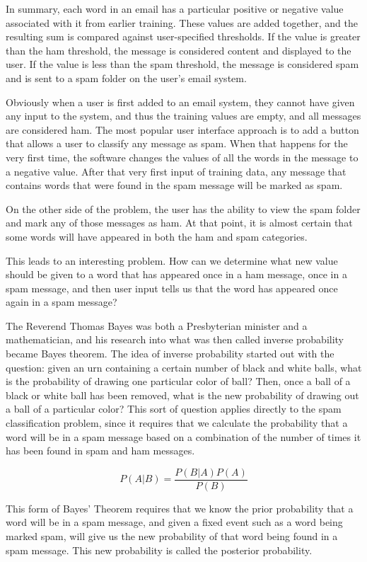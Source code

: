 \documentclass[12pt]{article}
\begin{document}
In summary, each word in an email has a particular positive or negative value associated with it from earlier
training. These values are added together, and the resulting sum is compared against user-specified
thresholds. If the value is greater than the ham threshold, the message is considered content and displayed to
the user. If the value is less than the spam threshold, the message is considered spam and is sent to a spam
folder on the user's email system.

Obviously when a user is first added to an email system, they cannot have given any input to the system, and
thus the training values are empty, and all messages are considered ham. The most popular user interface
approach is to add a button that allows a user to classify any message as spam. When that happens for the very
first time, the software changes the values of all the words in the message to a negative value. After that
very first input of training data, any message that contains words that were found in the spam message will be
marked as spam.

On the other side of the problem, the user has the ability to view the spam folder and mark any of those
messages as ham. At that point, it is almost certain that some words will have appeared in both the ham and
spam categories.

This leads to an interesting problem. How can we determine what new value should be given to a word that has
appeared once in a ham message, once in a spam message, and then user input tells us that the word has
appeared once again in a spam message?

The Reverend Thomas Bayes was both a Presbyterian minister and a mathematician, and his research into what was
then called inverse probability became Bayes theorem. The idea of inverse probability started out with the
question: given an urn containing a certain number of black and white balls, what is the probability of
drawing one particular color of ball? Then, once a ball of a black or white ball has been removed, what is the
new probability of drawing out a ball of a particular color? This sort of question applies directly to the
spam classification problem, since it requires that we calculate the probability that a word will be in a spam
message based on a combination of the number of times it has been found in spam and ham messages.

$$P(A|B)= \dfrac{P(B|A)P(A)}{P(B)}$$

This form of Bayes' Theorem requires that we know the prior probability that a word will be in a spam
message, and given a fixed event such as a word being marked spam, will give us the new probability of that
word being found in a spam message. This new probability is called the posterior probability.
\end{document}
